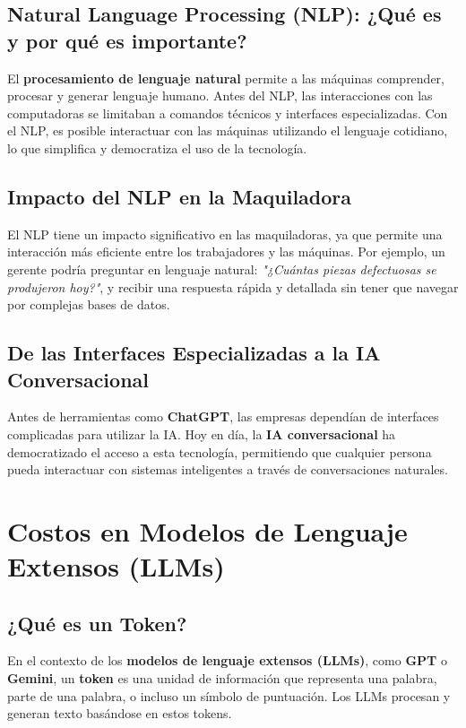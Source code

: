 \subsection{Natural Language Processing (NLP): ¿Qué es y por qué es importante?}
El \textbf{procesamiento de lenguaje natural} permite a las máquinas comprender, procesar y generar lenguaje humano. Antes del NLP, las interacciones con las computadoras se limitaban a comandos técnicos y interfaces especializadas. Con el NLP, es posible interactuar con las máquinas utilizando el lenguaje cotidiano, lo que simplifica y democratiza el uso de la tecnología.

\subsection{Impacto del NLP en la Maquiladora}
El NLP tiene un impacto significativo en las maquiladoras, ya que permite una interacción más eficiente entre los trabajadores y las máquinas. Por ejemplo, un gerente podría preguntar en lenguaje natural: \textit{"¿Cuántas piezas defectuosas se produjeron hoy?"}, y recibir una respuesta rápida y detallada sin tener que navegar por complejas bases de datos.

\subsection{De las Interfaces Especializadas a la IA Conversacional}
Antes de herramientas como \textbf{ChatGPT}, las empresas dependían de interfaces complicadas para utilizar la IA. Hoy en día, la \textbf{IA conversacional} ha democratizado el acceso a esta tecnología, permitiendo que cualquier persona pueda interactuar con sistemas inteligentes a través de conversaciones naturales.

\section{Costos en Modelos de Lenguaje Extensos (LLMs)}\label{costo-en-llms}

\subsection{¿Qué es un Token?}\label{que-es-un-token}
En el contexto de los \textbf{modelos de lenguaje extensos (LLMs)}, como \textbf{GPT} o \textbf{Gemini}, un \textbf{token} es una unidad de información que representa una palabra, parte de una palabra, o incluso un símbolo de puntuación. Los LLMs procesan y generan texto basándose en estos tokens.


